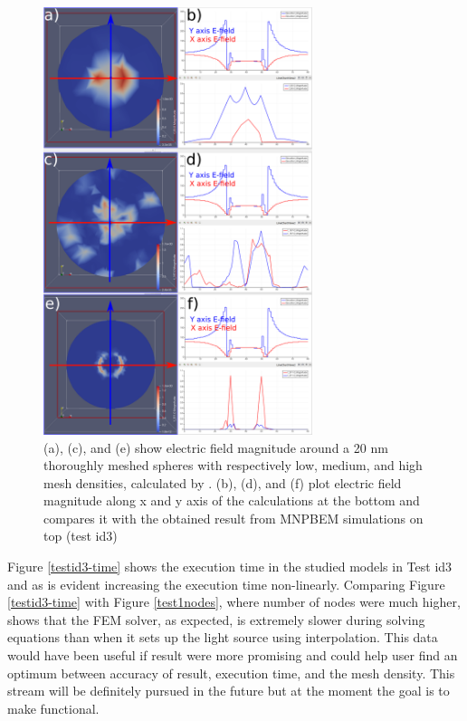 \documentclass[12pt, titlepage]{article}
\begin{document}
\begin{enumerate}
    \begin{figure} \centering \includegraphics[width=0.7\textwidth]{testid3-fill.png}
	\caption{(a), (c), and (e) show electric field magnitude around a 20 nm thoroughly meshed spheres with respectively low, medium, and high mesh densities, calculated by \progname{}. (b), (d), and (f) plot electric field magnitude along x and y axis of the \progname{} calculations at the bottom and compares it with the obtained result from MNPBEM simulations on top (test id3)} \label{testid3-2} 
\end{figure}

Figure \ref{testid3-time} shows the execution time in the studied models in Test id3 and as is evident increasing the execution time non-linearly. Comparing Figure \ref{testid3-time} with Figure \ref{test1nodes}, where number of nodes were much higher, shows that the FEM solver, as expected, is extremely slower during solving equations than when it sets up the light source using interpolation. This data would have been useful if \progname{} result were more promising and could help user find an optimum between accuracy of result, execution time, and the mesh density. This stream will be definitely pursued in the future but at the moment the goal is to make \progname functional.


\end{enumerate}
\end{document}

